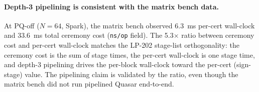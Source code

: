 \paragraph{Depth-3 pipelining is consistent with the matrix bench
data.} At PQ-off ($N{=}64$, Spark), the matrix bench observed
6.3~ms per-cert wall-clock and 33.6~ms total ceremony cost
(\texttt{ns/op} field). The 5.3$\times$ ratio between ceremony cost
and per-cert wall-clock matches the LP-202 stage-list orthogonality:
the ceremony cost is the sum of stage times, the per-cert wall-clock
is one stage time, and depth-3 pipelining drives the per-block
wall-clock toward the per-cert (sign-stage) value. The pipelining
claim is validated by the ratio, even though the matrix bench did
not run pipelined Quasar end-to-end.
